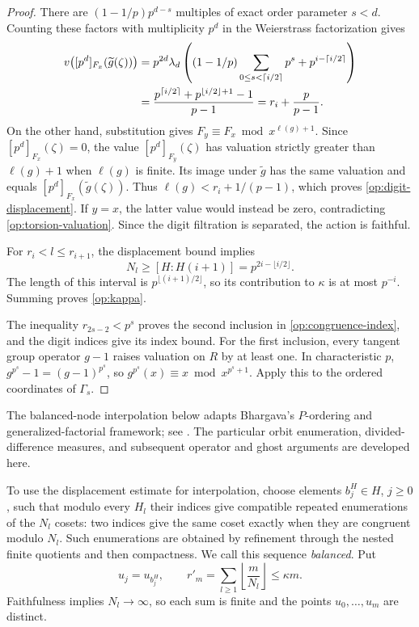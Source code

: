 \begin{proof}
There are $(1-1/p)p^{d-s}$ multiples of exact order parameter $s<d$.
Counting these factors with multiplicity $p^d$ in the Weierstrass
factorization gives
\begin{align}
 v\bigl([p^d]_{F_x}(\widetilde g(\zeta))\bigr)
 &=p^{2d}\lambda_d
   \left((1-1/p)\sum_{0\le s<\lceil i/2\rceil}p^s
                   +p^{i-\lceil i/2\rceil}\right)\notag\\
 &=\frac{p^{\lceil i/2\rceil}+p^{\lfloor i/2\rfloor+1}-1}{p-1}
   =r_i+\frac p{p-1}.
 \label{op:torsion-valuation}
\end{align}
On the other hand, substitution gives
$F_y\equiv F_x\bmod x^{\ell(g)+1}$. Since $[p^d]_{F_x}(\zeta)=0$,
the value $[p^d]_{F_y}(\zeta)$ has valuation strictly greater than
$\ell(g)+1$ when $\ell(g)$ is finite. Its image under $\widetilde g$
has the same valuation and equals
$[p^d]_{F_x}(\widetilde g(\zeta))$. Thus
$\ell(g)<r_i+1/(p-1)$, which proves
\eqref{op:digit-displacement}. If $y=x$, the latter value would instead
be zero, contradicting \eqref{op:torsion-valuation}. Since the digit
filtration is separated, the action is faithful.

For $r_i<l\le r_{i+1}$, the displacement bound implies
\[
 N_l\ge[H:H(i+1)]=p^{2i-\lfloor i/2\rfloor}.
\]
The length of this interval is $p^{\lfloor(i+1)/2\rfloor}$, so its
contribution to $\kappa$ is at most $p^{-i}$. Summing proves
\eqref{op:kappa}.

The inequality $r_{2s-2}<p^s$ proves the second inclusion in
\eqref{op:congruence-index}, and the digit indices give its index bound.
For the first inclusion, every tangent group operator $g-1$ raises
valuation on $R$ by at least one. In characteristic $p$,
$g^{p^s}-1=(g-1)^{p^s}$, so $g^{p^s}(x)\equiv x\bmod x^{p^s+1}$.
Apply this to the ordered coordinates of $\Gamma_s$.
\end{proof}

The balanced-node interpolation below adapts Bhargava's $P$-ordering
and generalized-factorial framework; see \cite[\S4]{Bhargava2000}.
The particular orbit enumeration, divided-difference measures, and
subsequent operator and ghost arguments are developed here.

To use the displacement estimate for interpolation, choose elements
$b_j^H\in H$, $j\ge0$, such that modulo every $H_l$
their indices give compatible repeated enumerations of the $N_l$
cosets: two indices give the same coset exactly when they are congruent
modulo $N_l$. Such enumerations are obtained by refinement through the
nested finite quotients and then compactness. We call this sequence
\emph{balanced}. Put
\begin{equation}
 u_j=u_{b_j^H},\qquad
 r'_m=\sum_{l\ge1}\left\lfloor\frac m{N_l}\right\rfloor
 \le\kappa m.
 \label{op:balanced}
\end{equation}
Faithfulness implies $N_l\longrightarrow\infty$, so each sum is finite
and the points $u_0,\ldots,u_m$ are distinct.

